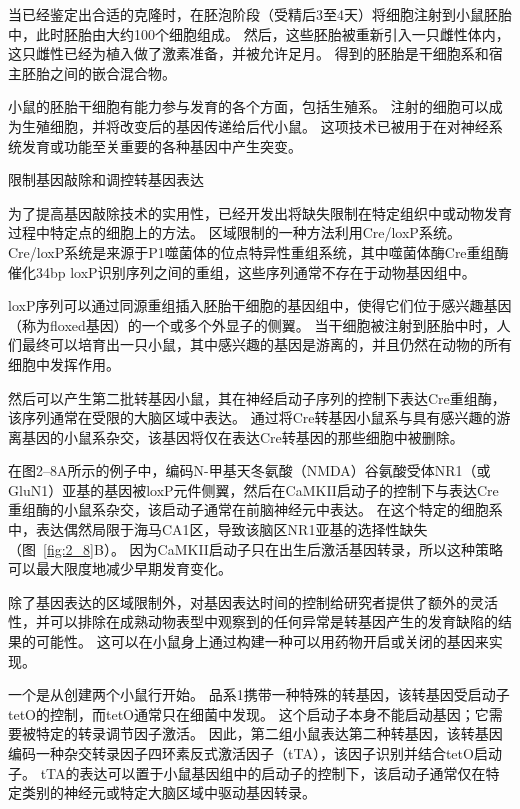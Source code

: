 \begin{proposition}[在实验动物中产生突变]
	\quad \quad 当已经鉴定出合适的克隆时，在胚泡阶段（受精后3至4天）将细胞注射到小鼠胚胎中，此时胚胎由大约100个细胞组成。
	然后，这些胚胎被重新引入一只雌性体内，这只雌性已经为植入做了激素准备，并被允许足月。
	得到的胚胎是干细胞系和宿主胚胎之间的嵌合混合物。
	
	\quad \quad 小鼠的胚胎干细胞有能力参与发育的各个方面，包括生殖系。
	注射的细胞可以成为生殖细胞，并将改变后的基因传递给后代小鼠。
	这项技术已被用于在对神经系统发育或功能至关重要的各种基因中产生突变。
	
	\quad \quad 限制基因敲除和调控转基因表达
	
	\quad \quad 为了提高基因敲除技术的实用性，已经开发出将缺失限制在特定组织中或动物发育过程中特定点的细胞上的方法。
	区域限制的一种方法利用Cre/loxP系统。
	Cre/loxP系统是来源于P1噬菌体的位点特异性重组系统，其中噬菌体酶Cre重组酶催化34bp loxP识别序列之间的重组，这些序列通常不存在于动物基因组中。
	
	\quad \quad loxP序列可以通过同源重组插入胚胎干细胞的基因组中，使得它们位于感兴趣基因（称为floxed基因）的一个或多个外显子的侧翼。
	当干细胞被注射到胚胎中时，人们最终可以培育出一只小鼠，其中感兴趣的基因是游离的，并且仍然在动物的所有细胞中发挥作用。
	
	\quad \quad 然后可以产生第二批转基因小鼠，其在神经启动子序列的控制下表达Cre重组酶，该序列通常在受限的大脑区域中表达。
	通过将Cre转基因小鼠系与具有感兴趣的游离基因的小鼠系杂交，该基因将仅在表达Cre转基因的那些细胞中被删除。
	
	\quad \quad 在图2–8A所示的例子中，编码N-甲基天冬氨酸（NMDA）谷氨酸受体NR1（或GluN1）亚基的基因被loxP元件侧翼，然后在CaMKII启动子的控制下与表达Cre重组酶的小鼠系杂交，该启动子通常在前脑神经元中表达。
	在这个特定的细胞系中，表达偶然局限于海马CA1区，导致该脑区NR1亚基的选择性缺失（图~\ref{fig:2_8}B）。
	因为CaMKII启动子只在出生后激活基因转录，所以这种策略可以最大限度地减少早期发育变化。
	
	\quad \quad 除了基因表达的区域限制外，对基因表达时间的控制给研究者提供了额外的灵活性，并可以排除在成熟动物表型中观察到的任何异常是转基因产生的发育缺陷的结果的可能性。
	这可以在小鼠身上通过构建一种可以用药物开启或关闭的基因来实现。
	
	\quad \quad 一个是从创建两个小鼠行开始。
	品系1携带一种特殊的转基因，该转基因受启动子tetO的控制，而tetO通常只在细菌中发现。
	这个启动子本身不能启动基因；它需要被特定的转录调节因子激活。
	因此，第二组小鼠表达第二种转基因，该转基因编码一种杂交转录因子四环素反式激活因子（tTA），该因子识别并结合tetO启动子。
	tTA的表达可以置于小鼠基因组中的启动子的控制下，该启动子通常仅在特定类别的神经元或特定大脑区域中驱动基因转录。
	

\end{proposition}
